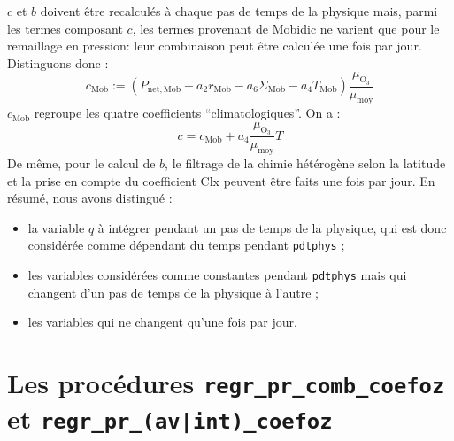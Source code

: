\documentclass[a4paper,english,french]{article}
\begin{document}
$c$ et $b$ doivent être recalculés à chaque pas de temps de la
physique mais, parmi les termes composant $c$, les termes provenant de
Mobidic ne varient que pour le remaillage en pression: leur
combinaison peut être calculée une fois par jour. Distinguons donc :
\begin{displaymath}
  c_\mathrm{Mob}
  :=
  (P_\mathrm{net,Mob} - a_2 r_\mathrm{Mob}
  - a_6 \Sigma_\mathrm{Mob} - a_4 T_\mathrm{Mob})
  \frac{\mu_{\mathrm{O}_3}}{\mu_\mathrm{moy}}
\end{displaymath}
$c_\mathrm{Mob}$ regroupe les quatre coefficients ``climatologiques''.
On a :
\begin{displaymath}
  c = c_\mathrm{Mob} + a_4 \frac{\mu_{\mathrm{O}_3}}{\mu_\mathrm{moy}} T
\end{displaymath}
De même, pour le calcul de $b$, le filtrage de la chimie hétérogène
selon la latitude et la prise en compte du coefficient Clx peuvent
être faits une fois par jour. En résumé, nous avons distingué :
\begin{itemize}
\item la variable $q$ à intégrer pendant un pas de temps de la
  physique, qui est donc considérée comme dépendant du temps pendant
  \verb+pdtphys+ ;
\item les variables considérées comme constantes pendant
  \verb+pdtphys+ mais qui changent d'un pas de temps de la physique à
  l'autre ;
\item les variables qui ne changent qu'une fois par jour.
\end{itemize}

\section[\texttt{regr\_pr\_comb\_coefoz} et
\texttt{regr\_pr\_(av|int)\_coefoz}]{Les procédures
  \texttt{regr\_pr\_comb\_coefoz} et
  \texttt{regr\_pr\_(av|int)\_coefoz}}
\end{document}
